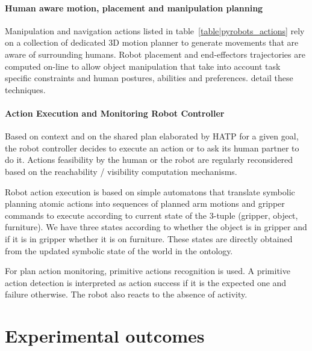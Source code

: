\documentclass[preprint,3p,times]{elsarticle}
\begin{document}
\paragraph{Human aware motion, placement and manipulation planning}
Manipulation and navigation actions listed in
table~\ref{table|pyrobots_actions} rely on a collection of dedicated 3D motion
planner to generate movements that are aware of surrounding humans. Robot
placement and end-effectors trajectories are computed on-line to allow object
manipulation that take into account task specific constraints and human
postures, abilities and preferences. \cite{Sisbot2008, Mainprice2011,
Pandey2011} detail these techniques.


\paragraph{Action Execution and Monitoring Robot Controller}
Based on context and on the shared plan elaborated by HATP for a given goal,
the robot controller decides to execute an action or to ask its human
partner to do it.  Actions feasibility by the human or the robot are
regularly reconsidered based on the reachability / visibility
computation mechanisms.

Robot action execution is based on simple automatons  that translate
symbolic planning atomic actions into sequences of planned arm motions
and gripper commands to execute according to current state
of the 3-tuple (gripper, object, furniture). We have three states
according to whether the object is in gripper and if it is in gripper
whether it is on furniture.  These states are directly obtained from
the updated symbolic state of the world in the ontology.

For plan action monitoring, primitive actions recognition is used. A primitive
action detection is interpreted as action success if it is the expected one and
failure otherwise. The robot also reacts to the absence of activity.




\section{Experimental outcomes}
\label{sec:expe}
\end{document}
